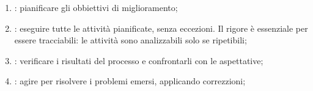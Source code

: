 \begin{enumerate}
	\item {}: pianificare gli obbiettivi di miglioramento;
	\item {}: eseguire tutte le attività pianificate, senza eccezioni. Il rigore è essenziale per essere tracciabili: le attività sono analizzabili solo se ripetibili;
	\item {}: verificare i risultati del processo e confrontarli con le aspettative;
	\item {}: agire per risolvere i problemi emersi, applicando correzzioni;
\end{enumerate}
